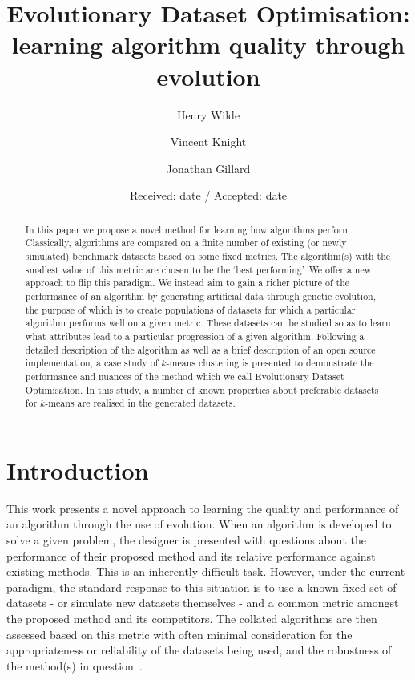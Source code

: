 \documentclass[smallextended]{svjour3}
\title{%
    Evolutionary Dataset Optimisation:
    learning algorithm quality through evolution
}
\author{Henry Wilde \and Vincent Knight \and Jonathan Gillard}
\institute{%
    School of Mathematics, Senghennydd Rd, Cardiff, WALES CF24 4AG \\
    \textit{\email{\{wildehd, knightva, gillardjw\}@cardiff.ac.uk}}
}
\date{Received: date / Accepted: date}
\begin{document}


\maketitle%


\begin{abstract}
    In this paper we propose a novel method for learning how algorithms perform.
    Classically, algorithms are compared on a finite number of existing (or
    newly simulated) benchmark datasets based on some fixed metrics. The
    algorithm(s) with the smallest value of this metric are chosen to be the
    `best performing'. We offer a new approach to flip this paradigm. We
    instead aim to gain a richer picture of the performance of an algorithm by
    generating artificial data through genetic evolution, the purpose of which
    is to create populations of datasets for which a particular algorithm
    performs well on a given metric. These datasets can be studied so as to
    learn what attributes lead to a particular progression of a given algorithm.
    Following a detailed description of the algorithm as well as a brief
    description of an open source implementation, a case study of \(k\)-means
    clustering is presented to demonstrate the performance and nuances of the
    method which we call Evolutionary Dataset Optimisation. In this study, a
    number of known properties about preferable datasets for \(k\)-means are
    realised in the generated datasets.

\end{abstract}


\section{Introduction}\label{section:introduction}

This work presents a novel approach to learning the quality and performance of
an algorithm through the use of evolution. When an algorithm is developed to
solve a given problem, the designer is presented with questions about the
performance of their proposed method and its relative performance against
existing methods. This is an inherently difficult task. However, under the
current paradigm, the standard response to this situation is to use a known
fixed set of datasets \-- or simulate new datasets themselves \-- and a common
metric amongst the proposed method and its competitors. The collated algorithms
are then assessed based on this metric with often minimal consideration for
the appropriateness or reliability of the datasets being used, and the
robustness of the method(s) in question~\cite{Abualigah2018a,Huang1998,Liu2016}.
\end{document}
